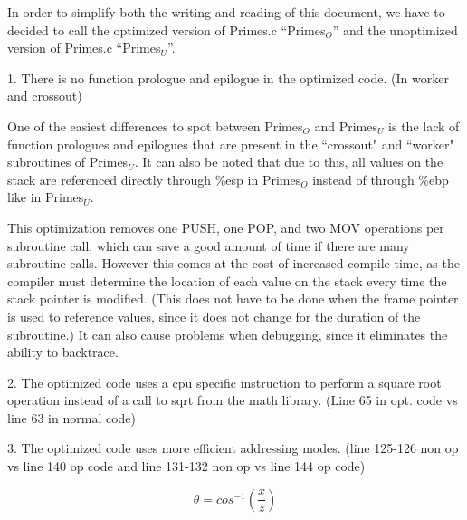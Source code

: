 \documentclass[11pt]{article}
\begin{document}
In order to simplify both the writing and reading of this document, we have to decided to call the optimized version of Primes.c ``Primes$_{O}$'' and the unoptimized version of Primes.c ``Primes$_{U}$''.

1. There is no function prologue and epilogue in the optimized code. (In worker and crossout)

One of the easiest differences to spot between Primes$_{O}$ and Primes$_{U}$ is the lack of function prologues and epilogues that are present in the ``crossout" and ``worker" subroutines of Primes$_{U}$. It can also be noted that due to this, all values on the stack are referenced directly through \%esp in Primes$_{O}$ instead of through \%ebp like in Primes$_{U}$.

This optimization removes one PUSH, one POP, and two MOV operations per subroutine call, which can save a good amount of time if there are many subroutine calls. However this comes at the cost of increased compile time, as the compiler must determine the location of each value on the stack every time the stack pointer is modified. (This does not have to be done when the frame pointer is used to reference values, since it does not change for the duration of the subroutine.) It can also cause problems when debugging, since it eliminates the ability to backtrace. 

2. The optimized code uses a cpu specific instruction to perform a square root operation instead of a call to sqrt from the math library. (Line 65 in opt. code vs line 63 in normal code)

3. The optimized code uses more efficient addressing modes. (line 125-126 non op vs line 140 op code and line 131-132 non op vs line 144 op code)


\begin{equation}
\theta = cos^{-1}(\frac{x}{z})  %
\end{equation}

\end{document}
